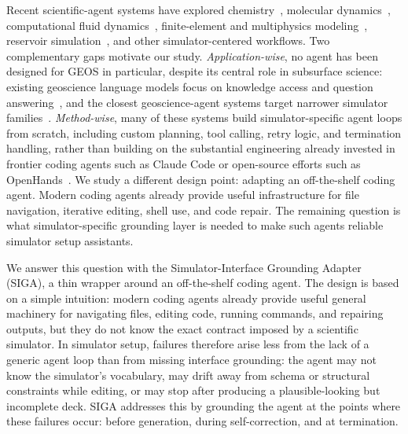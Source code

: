 \documentclass{article}
\begin{document}
Recent scientific-agent systems have explored chemistry~\citep{bran2024chemcrow,boiko2023coscientist}, molecular dynamics~\citep{shi2026mdagent2,zhao2026polyjarvis,guilbert2025dynamate}, computational fluid dynamics~\citep{chen2024metaopenfoam,yue2025foamagent,pandey2025openfoamgpt}, finite-element and multiphysics modeling~\citep{zhan2025mooseagent,mcpsim2026,ni2024mechagents}, reservoir simulation~\citep{moyner2026jutulgpt}, and other simulator-centered workflows. Two complementary gaps motivate our study. \emph{Application-wise}, no agent has been designed for GEOS in particular, despite its central role in subsurface science: existing geoscience language models focus on knowledge access and question answering~\citep{deng2023k2,lin2024geogalactica}, and the closest geoscience-agent systems target narrower simulator families~\citep{bekele2025geosim,li2025seismologyagent,moyner2026jutulgpt}. \emph{Method-wise}, many of these systems build simulator-specific agent loops from scratch, including custom planning, tool calling, retry logic, and termination handling, rather than building on the substantial engineering already invested in frontier coding agents such as Claude Code or open-source efforts such as OpenHands~\citep{wang2024openhands}. We study a different design point: adapting an off-the-shelf coding agent. Modern coding agents already provide useful infrastructure for file navigation, iterative editing, shell use, and code repair. The remaining question is what simulator-specific grounding layer is needed to make such agents reliable simulator setup assistants.

We answer this question with the Simulator-Interface Grounding Adapter (SIGA), a thin wrapper around an off-the-shelf coding agent. The design is based on a simple intuition: modern coding agents already provide useful general machinery for navigating files, editing code, running commands, and repairing outputs, but they do not know the exact contract imposed by a scientific simulator. In simulator setup, failures therefore arise less from the lack of a generic agent loop than from missing interface grounding: the agent may not know the simulator’s vocabulary, may drift away from schema or structural constraints while editing, or may stop after producing a plausible-looking but incomplete deck. SIGA addresses this by grounding the agent at the points where these failures occur: before generation, during self-correction, and at termination.
\end{document}
